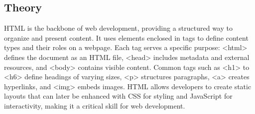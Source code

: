\documentclass[a4paper,9pt]{article}
\begin{document}
\subsection{Theory}
HTML is the backbone of web development, providing a structured way to organize and present content. It uses elements enclosed in tags to define content types and their roles on a webpage. Each tag serves a specific purpose: <html> defines the document as an HTML file, <head> includes metadata and external resources, and <body> contains visible content. Common tags such as <h1> to <h6> define headings of varying sizes, <p> structures paragraphs, <a> creates hyperlinks, and <img> embeds images. HTML allows developers to create static layouts that can later be enhanced with CSS for styling and JavaScript for interactivity, making it a critical skill for web development.
\end{document}
